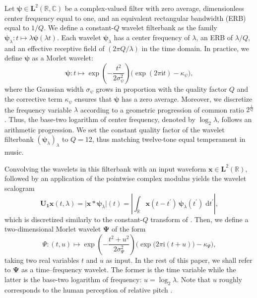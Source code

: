 \documentclass{bmcart}
\begin{document}
Let $\boldsymbol{\psi} \in \mathbf{L}^2(\mathbb{R}, \mathbb{C})$ be a complex-valued filter with zero average, dimensionless center frequency equal to one, and an equivalent rectangular bandwidth (ERB) equal to $1/Q$.
We define a constant-$Q$ wavelet filterbank as the family $\boldsymbol{\psi}_{\lambda} : t \mapsto \lambda \boldsymbol{\psi}(\lambda t)$.
Each wavelet $\boldsymbol{\psi}_{\lambda}$ has a center frequency of $\lambda$, an ERB of $\lambda/Q$, and an effective receptive field of $(2\pi Q/\lambda)$ in the time domain.
In practice, we define $\boldsymbol{\psi}$ as a Morlet wavelet:
\begin{equation}
\boldsymbol{\psi}:t \longmapsto \exp\left(-\dfrac{t^2}{2\sigma_{\psi}^2}\right)
\big( \exp\left(2\pi \mathrm{i}t\right) - \kappa_{\psi} \big),
\label{eq:psi}
\end{equation}
where the Gaussian width $\sigma_{\psi}$ grows in proportion with the quality factor $Q$ and the corrective term $\kappa_{\psi}$ ensures that $\boldsymbol{\psi}$ has a zero average.
Moreover, we discretize the frequency variable $\lambda$ according to a geometric progression of common ratio $2^{\frac{1}{Q}}$.
Thus, the base-two logarithm of center frequency, denoted by $\log_2 \lambda$, follows an arithmetic progression.
We set the constant quality factor of the wavelet filterbank $(\boldsymbol{\psi}_\lambda)_\lambda$ to $Q=12$, thus matching twelve-tone equal temperament in music.

Convolving the wavelets in this filterbank with an input waveform $\boldsymbol{x}\in\mathbf{L}^2(\mathbb{R})$, followed by an application of the pointwise complex modulus yields the wavelet scalogram
\begin{equation}
\mathbf{U_1}\boldsymbol{x}(t,\lambda) =
\big\vert
\boldsymbol{x}
\ast
\boldsymbol{\psi}_{\lambda}
\big\vert(t)
=
\left\vert
\int_{\mathbb{R}}
\boldsymbol{x}(t - t^{\prime})
\,
\boldsymbol{\psi}_{\lambda} (t^{\prime})
\;
\mathrm{d}{t^\prime}
\right\vert,
\label{eq:U1}
\end{equation}
which is discretized similarly to the constant-$Q$ transform of \cite{schorkhuber2010smc}.
Then, we define a two-dimensional Morlet wavelet $\boldsymbol{\Psi}$ of the form
\begin{equation}
\Psi : (t, u) \longmapsto
\exp\left(-\dfrac{t^2+u^2}{2\sigma_{\Psi}^2}\right)
\Big( \exp\big(2\pi \mathrm{i} (t + u)\big) - \kappa_{\Psi} \Big),
\label{eq:Psi}
\end{equation}
taking two real variables $t$ and $u$ as input.
In the rest of this paper, we shall refer to $\boldsymbol{\Psi}$ as a time--frequency wavelet.
The former is the time variable while the latter is the base-two logarithm of frequency: $u = \log_2 \lambda$.
Note that $u$ roughly corresponds to the human perception of relative pitch \cite{lostanlen2020icassp}.
\end{document}
